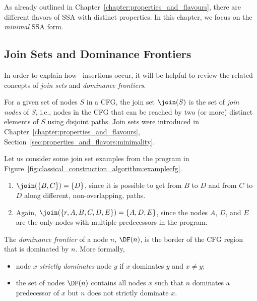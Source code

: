 {As already outlined in Chapter~\ref{chapter:properties_and_flavours},
there are different flavors of SSA with distinct properties.
In this chapter, we focus on the \textit{minimal} SSA form.

\subsection{Join Sets and Dominance Frontiers}

In order to explain how \phifun\ insertions occur,
it will be helpful 
to review the related concepts of \textit{join sets} and
\textit{dominance frontiers}.

For a given set of nodes $S$ in a CFG, the join set $\join(S)$
is the set of \textit{join nodes} of $S$,
i.e., nodes in the CFG that can be reached by
two (or more) distinct elements of $S$ using disjoint paths.
Join sets were introduced in Chapter~\ref{chapter:properties_and_flavours}, 
Section~\ref{sec:properties_and_flavors:minimality}.

Let us consider some join set examples from the
program in Figure~\ref{fig:classical_construction_algorithm:examplecfg}.
\begin{enumerate}
\item $\join(\{B,C\}) = \{D\}$, since it is possible to get from $B$ to $D$
and from $C$ to $D$ along different, non-overlapping, paths.
\item Again, $\join(\{r, A, B, C, D, E \}) = \{A,D,E\}$, since the nodes
$A$, $D$, and $E$ are the only nodes with multiple predecessors in
the program.
\end{enumerate}


The \textit{dominance frontier} of a node $n$,
$\DF(n)$, is the border of the CFG region that is dominated by $n$.
More formally,
\begin{itemize}
\item node $x$ \textit{strictly dominates} node $y$ if $x$ dominates
  $y$ and $x \neq y$;
\item the set of nodes $\DF(n)$ contains all nodes $x$ such that $n$
  dominates a predecessor of $x$ but $n$ does not strictly dominate $x$.
\end{itemize}

}
